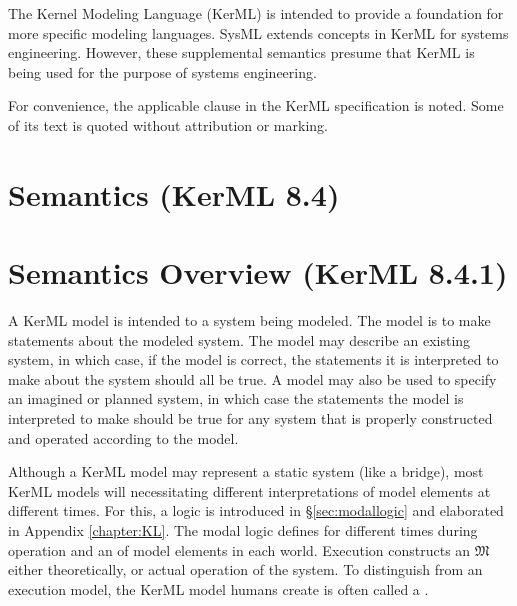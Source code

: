 
\pn The Kernel Modeling Language (KerML) \cite{KerML} is intended to provide a foundation for more specific modeling languages.  SysML extends concepts in KerML for systems engineering.
 However, these supplemental semantics presume that KerML is being used for the purpose of systems engineering.

\pn For convenience, the applicable clause in the KerML specification is noted.  Some of its text is quoted without attribution or marking.

\section{Semantics (KerML 8.4)}


\section{Semantics Overview (KerML 8.4.1)}

\pn A KerML model is intended to  a system being modeled. The model is  to make statements about the modeled system. The model may describe an existing system, in which case, if the model is correct, the statements it is interpreted to make about the system should all be true. A model may also be used to specify an imagined or planned system, in which case the statements the model is interpreted to make should be true for any system that is properly constructed and operated according to the model.

\pn Although a KerML model may represent a static system (like a bridge), most KerML models will  necessitating different interpretations of model elements at different times.  For this, a  logic is introduced in \S\ref{sec:modallogic}
and elaborated in Appendix \ref{chapter:KL}. %
The modal logic defines  for different times during operation and an  of model elements in each world.  Execution constructs an  $\mathfrak{M}$ either theoretically, or actual operation of the system.  To distinguish from an execution model, the KerML model humans create is often called a .

